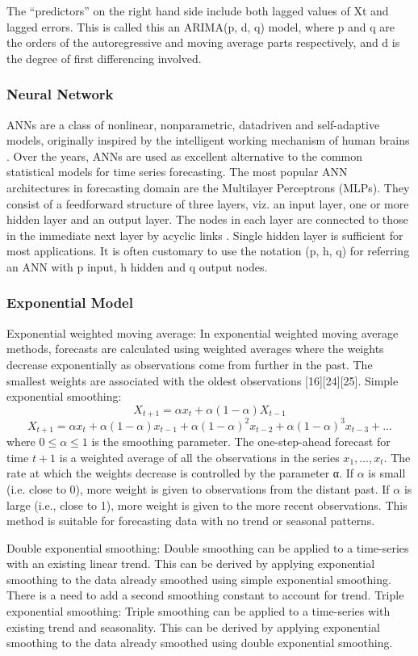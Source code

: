 The “predictors” on the right hand side include both lagged values of Xt and lagged errors. This is called this an ARIMA(p, d, q) model, where p and q are the orders of the autoregressive and moving average parts respectively, and d is the degree of first differencing involved.


\subsubsection{Neural Network}
ANNs are a class of nonlinear, nonparametric, datadriven and self-adaptive models, originally inspired by the
intelligent working mechanism of human brains . Over the years, ANNs are used as excellent alternative to the common statistical models for time series forecasting. The most popular ANN architectures in forecasting domain are the Multilayer Perceptrons (MLPs). They consist of a feedforward structure of three layers, viz. an input layer, one or more hidden layer and an output layer. The nodes in each layer are connected to those in the immediate next layer by acyclic links . Single hidden layer is sufficient for most applications. It is often customary to use the notation (p, h, q) for referring an ANN with p input, h hidden and q output nodes.

\subsubsection{Exponential Model}
Exponential weighted moving average: In exponential weighted moving average methods, forecasts are calculated using weighted averages where the weights decrease exponentially as observations come from further in the past. The smallest weights are associated with the oldest observations [16][24][25].
Simple exponential smoothing:
	$$X_{t+1}=\alpha x_t +\alpha(1-\alpha)X_{t-1}$$
	$$X_{t+1}=\alpha x_t +\alpha(1-\alpha)x_{t-1}+\alpha(1-\alpha)^2x_{t-2}+\alpha(1-\alpha)^3x_{t-3}+...$$
where $0\leq \alpha \leq 1$ is the smoothing parameter. The one-step-ahead forecast for time $t+1$ is a weighted average of all the observations in the series $x_1, …, x_t$. The rate at which the weights decrease is controlled by the parameter α. If $\alpha$ is small (i.e. close to 0), more weight is given to observations from the distant past. If $\alpha$ is large (i.e., close to 1), more weight is given to the more recent observations. This method is suitable for forecasting data with no trend or seasonal patterns.

Double exponential smoothing: Double smoothing can be applied to a time-series with an existing linear trend. This can be derived by applying exponential smoothing to the data already smoothed using simple exponential smoothing. There is a need to add a second smoothing constant to account for trend.
Triple exponential smoothing: Triple smoothing can be applied to a time-series with existing trend and seasonality. This can be derived by applying exponential smoothing to the data already smoothed using double exponential smoothing.


